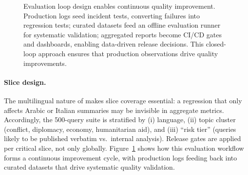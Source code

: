 \begin{figure}[t]
\centering
\begin{llmfigbox}
\end{llmfigbox}
\caption{Evaluation loop design enables continuous quality improvement. Production logs seed incident tests, converting failures into regression tests; curated datasets feed an offline evaluation runner for systematic validation; aggregated reports become CI/CD gates and dashboards, enabling data-driven release decisions. This closed-loop approach ensures that production observations drive quality improvements.}
\label{fig:ch10_ishtar_eval_loop}
\end{figure}

\paragraph{Slice design.}
The multilingual nature of \ishtar{} makes slice coverage essential: a regression that only affects Arabic or Italian summaries may be invisible in aggregate metrics.
Accordingly, the 500-query suite is stratified by (i) language, (ii) topic cluster (conflict, diplomacy, economy, humanitarian aid), and (iii) ``risk tier'' (queries likely to be published verbatim vs.\ internal analysis).
Release gates are applied per critical slice, not only globally. Figure~\ref{fig:ch10_ishtar_eval_loop} shows how this evaluation workflow forms a continuous improvement cycle, with production logs feeding back into curated datasets that drive systematic quality validation.

